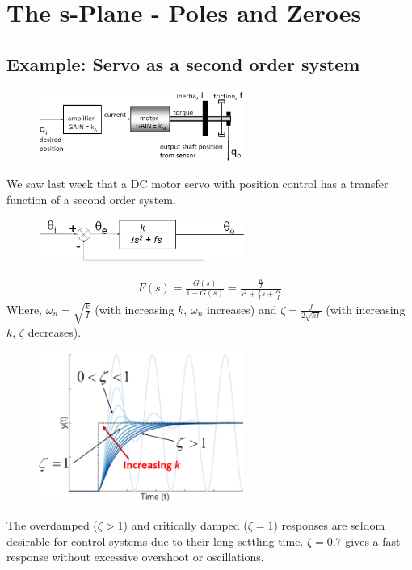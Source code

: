 \documentclass[class=report, crop=false, 12pt,a4paper]{standalone}
\begin{document}
\section{The s-Plane - Poles and Zeroes}
\subsection{Example: Servo as a second order system}
\begin{figure}[H]
  \centering
  \includegraphics[width = 0.6\textwidth]{../img/diagram87.png}
\end{figure}
We saw last week that a DC motor servo with position control has a transfer function of a second order system.
\begin{figure}[H]
  \centering
  \includegraphics[width = 0.6\textwidth]{../img/diagram88.png}
\end{figure}
\begin{align}
  F(s) = \frac{G(s)}{1+G(s)} = \frac{\frac{K}{I}}{s^2 + \frac{f}{I}s + \frac{K}{I}}
\end{align}
Where, $\omega_n = \sqrt{\frac{k}{I}}$ (with increasing $k$, $\omega_n$ increases) and $\zeta = \frac{f}{2\sqrt{kI}}$ (with increasing $k$, $\zeta$ decreases).
\begin{figure}[H]
  \centering
  \includegraphics[width = 0.6\textwidth]{../img/diagram89.png}
\end{figure}
The overdamped ($\zeta > 1$) and critically damped ($\zeta = 1$) responses are seldom desirable for control systems due to their long settling time. $\zeta = 0.7$ gives a fast response without excessive overshoot or oscillations.
\end{document}

